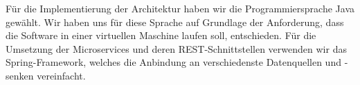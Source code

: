 Für die Implementierung der Architektur haben wir die Programmiersprache Java gewählt.
Wir haben uns für diese Sprache auf Grundlage der Anforderung, dass die Software in einer virtuellen Maschine laufen
soll, entschieden.
Für die Umsetzung der Microservices und deren REST-Schnittstellen verwenden wir das Spring-Framework, welches die
Anbindung an verschiedenste Datenquellen und -senken vereinfacht.